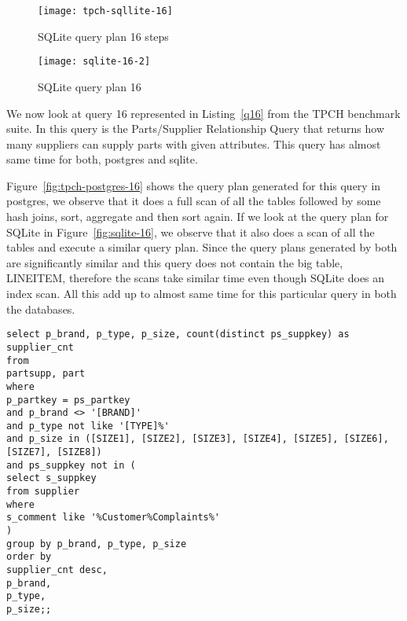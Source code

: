 \begin{figure*}[ht]
\centering
     \begin{subfigure}[b]{0.4\textwidth}
         \centering
         \texttt{[image: tpch-sqllite-16]}
         \caption{SQLite query plan 16 steps}
         \label{fig:tpch-sqllite-16}
     \end{subfigure}
     \hfill
     \begin{subfigure}[b]{0.4\textwidth}
         \centering
         \texttt{[image: sqlite-16-2]}
         \caption{SQLite query plan 16}
         \label{fig:sqlite-16-2}
     \end{subfigure}

        \caption{SQLite plan for query 16}
        \label{fig:sqlite-16}
\end{figure*}

We now look at query 16 represented in Listing~\ref{q16} from the TPCH benchmark suite. In this query is the Parts/Supplier Relationship Query that returns how many suppliers can supply parts with given attributes. This query has almost same time for both, postgres and sqlite. 

Figure~\ref{fig:tpch-postgres-16} shows the query plan generated for this query in postgres, we observe that it does a full scan of all the tables followed by some hash joins, sort, aggregate and then sort again. If we look at the query plan for SQLite in Figure~\ref{fig:sqlite-16}, we observe that it also does a scan of all the tables and execute a similar query plan. Since the query plans generated by both are significantly similar and this query does not contain the big table, LINEITEM, therefore the scans take similar time even though SQLite does an index scan. All this add up to almost same time for this particular query in both the databases.\\

\begin{minipage}{\linewidth}
\begin{lstlisting}[breaklines=true, numbers=none, label=q16, caption=Query 16]
select p_brand, p_type, p_size, count(distinct ps_suppkey) as supplier_cnt
from
partsupp, part
where
p_partkey = ps_partkey
and p_brand <> '[BRAND]'
and p_type not like '[TYPE]%'
and p_size in ([SIZE1], [SIZE2], [SIZE3], [SIZE4], [SIZE5], [SIZE6], [SIZE7], [SIZE8])
and ps_suppkey not in (
select s_suppkey
from supplier
where
s_comment like '%Customer%Complaints%'
)
group by p_brand, p_type, p_size
order by
supplier_cnt desc,
p_brand,
p_type,
p_size;;
\end{lstlisting}
\end{minipage}



